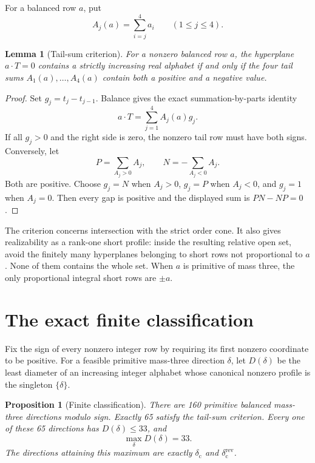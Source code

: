 \documentclass[11pt]{article}
\newtheorem{proposition}[theorem]{Proposition}
\newtheorem{lemma}[theorem]{Lemma}
\theoremstyle{definition}
\begin{document}
For a balanced row $a$, put
\[
                         A_j(a)=\sum_{i=j}^4a_i
                         \qquad(1\leq j\leq4).
\]

\begin{lemma}[Tail-sum criterion]\label{lem:tails}
For a nonzero balanced row $a$, the hyperplane $a\cdot T=0$ contains a strictly increasing real alphabet if
and only if the four tail sums $A_1(a),\ldots,A_4(a)$ contain both a positive
and a negative value.
\end{lemma}

\begin{proof}
Set $g_j=t_j-t_{j-1}$.  Balance gives the exact summation-by-parts identity
\[
                         a\cdot T=\sum_{j=1}^4 A_j(a)g_j.
\]
If all $g_j>0$ and the right side is zero, the nonzero tail row must have both
signs.  Conversely, let
\[
 P=\sum_{A_j>0}A_j,
 \qquad N=-\sum_{A_j<0}A_j.
\]
Both are positive.  Choose $g_j=N$ when $A_j>0$, $g_j=P$ when $A_j<0$, and
$g_j=1$ when $A_j=0$.  Then every gap is positive and the displayed sum is
$PN-NP=0$.
\end{proof}

The criterion concerns intersection with the strict order cone.  It also
gives realizability as a rank-one short profile: inside the resulting
relative open set, avoid the finitely many hyperplanes belonging to short
rows not proportional to $a$.  None of them contains the whole set.  When
$a$ is primitive of mass three, the only proportional integral short rows
are $\pm a$.

\section{The exact finite classification}

Fix the sign of every nonzero integer row by requiring its first nonzero
coordinate to be positive.  For a feasible primitive mass-three direction
$\delta$, let $D(\delta)$ be the least diameter of an increasing integer
alphabet whose canonical nonzero profile is the singleton $\{\delta\}$.

\begin{proposition}[Finite classification]\label{prop:census}
There are 160 primitive balanced mass-three directions modulo sign.  Exactly
65 satisfy the tail-sum criterion.  Every one of these 65 directions has
$D(\delta)\leq33$, and
\[
 \max_{\delta}D(\delta)=33.
\]
The directions attaining this maximum are exactly
$\delta_{\mathrm c}$ and $\delta_{\mathrm c}^{\mathrm{rev}}$.
\end{proposition}
\end{document}
